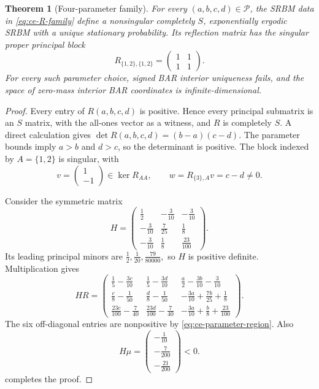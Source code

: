 \documentclass[aihp]{imsart}
\numberwithin{equation}{section}
\theoremstyle{plain}
\newtheorem{theorem}{Theorem}[section]
\theoremstyle{definition}
\newcommand{\1}{\mathbf 1}
\begin{document}
\begin{theorem}[Four-parameter family]\label{thm:four-parameter-family}
For every $(a,b,c,d)\in\mathcal P$, the SRBM data in \eqref{eq:ce-R-family} define a nonsingular completely $S$, exponentially ergodic SRBM with a unique stationary probability. Its reflection matrix has the singular proper principal block
\[
 R_{\{1,2\},\{1,2\}}
 =\begin{pmatrix}1&1\\1&1\end{pmatrix}.
\]
For every such parameter choice, signed BAR interior uniqueness fails, and the space of zero-mass interior BAR coordinates is infinite-dimensional.
\end{theorem}

\begin{proof}
Every entry of $R(a,b,c,d)$ is positive. Hence every principal submatrix is an $S$ matrix, with the all-ones vector as a witness, and $R$ is completely $S$. A direct calculation gives $\det R(a,b,c,d)=(b-a)(c-d).$ The parameter bounds imply $a>b$ and $d>c$, so the determinant is positive. The block indexed by $A=\{1,2\}$ is singular, with
\[
 v=\begin{pmatrix}1\\-1\end{pmatrix}\in\ker R_{AA},
 \qquad
 w=R_{\{3\},A}v=c-d\ne0.
\]

Consider the symmetric matrix
\begin{equation}\label{eq:ce-H}
H=
\begin{pmatrix}
\frac12&-\frac3{10}&-\frac3{10}\\
-\frac3{10}&\frac7{25}&\frac18\\
-\frac3{10}&\frac18&\frac{23}{100}
\end{pmatrix}.
\end{equation}
Its leading principal minors are $\frac12,\frac1{20},\frac{79}{80000},$ so $H$ is positive definite. Multiplication gives
\begin{equation}\label{eq:ce-HR-family}
HR=
\begin{pmatrix}
\frac15-\frac{3c}{10}
 &\frac15-\frac{3d}{10}
 &\frac a2-\frac{3b}{10}-\frac3{10}\\[2mm]
\frac c8-\frac1{50}
 &\frac d8-\frac1{50}
 &-\frac{3a}{10}+\frac{7b}{25}+\frac18\\[2mm]
\frac{23c}{100}-\frac7{40}
 &\frac{23d}{100}-\frac7{40}
 &-\frac{3a}{10}+\frac b8+\frac{23}{100}
\end{pmatrix}.
\end{equation}
The six off-diagonal entries are nonpositive by \eqref{eq:ce-parameter-region}. Also
\begin{equation}\label{eq:ce-Hmu}
H\mu=
\begin{pmatrix}
-\frac1{10}\\[1mm]
-\frac7{200}\\[1mm]
-\frac{21}{200}
\end{pmatrix}<0.
\end{equation}
 completes the proof.
\end{proof}
\end{document}
